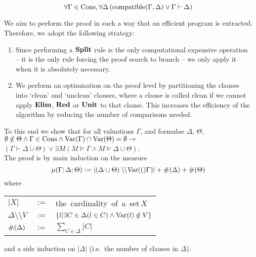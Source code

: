 \begin{comment}
We reformulate this as the following classically equivalent but constructively
stronger statement:
   $$\forall \Gamma,\Delta ( \compatible{\Gamma}{\Delta} \vee \Gamma \vdash \Delta)$$
While a proof of the former statement would only yield a program that
computes a DPLL proof for unsatisfiable formulae, the latter statement
yields in addition a model if $\Gamma$ and $\Delta$ are compatible.
\end{comment}
\medskip
\begin{mytheorem} 
\label{thm:dpllcompleteness}
$$ \forall \Gamma\in\mathrm{Cons}, \forall \Delta\,
     (\mathrm{compatible}(\Gamma,\Delta)  \lor  \Gamma \vdash \Delta) $$

\proof
{\rm
We aim to perform the proof in such a way that an efficient program 
is extracted. Therefore, we adopt the following strategy:
%
\begin{enumerate}
 \item Since performing a $\mathbf{Split}$ rule is the only computational expensive 
    operation
     -- it is the only rule forcing the proof search to branch -- we only
    apply it when it is absolutely necessary.

 \item  We perform an optimisation on the proof level by partitioning the clauses
    into `clean' and `unclean' clauses, where a clause is called clean if we
    cannot apply $\mathbf{Elim}$, $\mathbf{Red}$ or $\mathbf{Unit}$ to that clause.
    This increases the efficiency of the algorithm by reducing the number
    of comparisons needed.
\end{enumerate}
%
To this end we show that for all valuations $\Gamma$, and formulae $\Delta$, $\Theta$,\\[1em]
%
\hspace*{3em}$\emptyset \notin \Theta \wedge 
\Gamma\in\mathrm{Cons} \land \mathrm{Var}(\Gamma) \cap \mathrm{Var}(\Theta) = \emptyset\to$\\[.5em]
\hspace*{12em}$(\Gamma \vdash  \Delta\cup\Theta) \lor 
 \exists M(M \models \Gamma \land M \models \Delta\cup\Theta)$.\\[1em]
%
The proof is by main induction on the measure
%
$$\mu(\Gamma;\Delta;\Theta) := |(\Delta\cup\Theta) \setminus\!\!\setminus \mathrm{Var}(()\Gamma)|+
\#(\Delta)+\#(\Theta)$$
%
where
%
\begin{center}
\begin{tabular}{lll}
$|X|$             &$:=$& \hbox{the cardinality of a set}\,$X$\\
$\Delta \setminus\!\!\setminus V $
                &$:=$& $\{ l| \exists C\in \Delta(l \in C) \land \mathrm{Var}(l) \notin V \}$\\
$\#(\Delta) $&$:=$&$ \sum_{C\in\Delta}|C|$ 
\end{tabular}
\end{center}
%
and a side induction on $|\Delta|$ (i.e.~the number of clauses in $\Delta$).
%
\par

}
\end{mytheorem}
